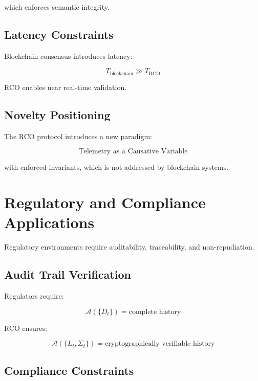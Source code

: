 which enforces semantic integrity.

\subsection{Latency Constraints}

Blockchain consensus introduces latency:

\begin{equation}
T_{\text{blockchain}} \gg T_{\text{RCO}}
\end{equation}

RCO enables near real-time validation.

\subsection{Novelty Positioning}

The RCO protocol introduces a new paradigm:

\begin{equation}
\text{Telemetry as a Causative Variable}
\end{equation}

with enforced invariants, which is not addressed by blockchain systems.

\section{Regulatory and Compliance Applications}

Regulatory environments require auditability, traceability, and non-repudiation.

\subsection{Audit Trail Verification}

Regulators require:

\begin{equation}
\mathcal{A}(\{D_t\}) = \text{complete history}
\end{equation}

RCO ensures:

\begin{equation}
\mathcal{A}(\{L_t, \Sigma_t\}) = \text{cryptographically verifiable history}
\end{equation}

\subsection{Compliance Constraints}


